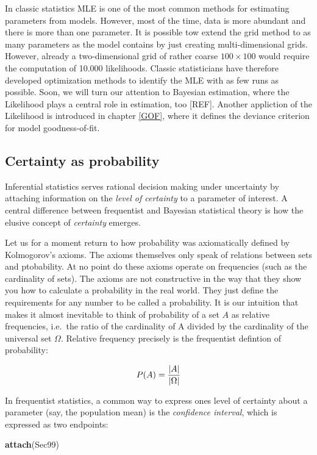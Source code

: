 \documentclass[]{svmono}
\newenvironment{Shaded}{\begin{snugshade}}{\end{snugshade}}
\newcommand{\KeywordTok}[1]{\textcolor[rgb]{0.13,0.29,0.53}{\textbf{#1}}}
\newcommand{\NormalTok}[1]{#1}
\begin{document}
In classic statistics MLE is one of the most common methods for
estimating parameters from models. However, most of the time, data is
more abundant and there is more than one parameter. It is possible tow
extend the grid method to as many parameters as the model contains by
just creating multi-dimensional grids. However, already a
two-dimensional grid of rather coarse \(100 \times 100\) would require
the computation of 10.000 likelihoods. Classic statisticians have
therefore developed optimization methods to identify the MLE with as few
runs as possible. Soon, we will turn our attention to Bayesian
estimation, where the Likelihood plays a central role in estimation, too
{[}REF{]}. Another appliction of the Likelihood is introduced in chapter
\ref{GOF}, where it defines the deviance criterion for model
goodness-of-fit.

\subsection{Certainty as probability}\label{certainty-as-probability}

Inferential statistics serves rational decision making under uncertainty
by attaching information on the \emph{level of certainty} to a parameter
of interest. A central difference between frequentist and Bayesian
statistical theory is how the elusive concept of \emph{certainty}
emerges.

Let us for a moment return to how probability was axiomatically defined
by Kolmogorov's axioms. The axioms themselves only speak of relations
between sets and ptobability. At no point do these axioms operate on
frequencies (such as the cardinality of sets). The axioms are not
constructive in the way that they show you how to calculate a
probability in the real world. They just define the requirements for any
number to be called a probability. It is our intuition that makes it
almost inevitable to think of probability of a set \(A\) as relative
frequencies, i.e.~the ratio of the cardinality of A divided by the
cardinality of the universal set \(\Omega\). Relative frequency
precisely is the frequentist defintion of probability:

\[
P(A) = {|A| \over |\Omega|}
\]

In frequentist statistics, a common way to express ones level of
certainty about a parameter (say, the population mean) is the
\emph{confidence interval}, which is expressed as two endpoints:

\begin{Shaded}
\begin{Highlighting}[]
\KeywordTok{attach}\NormalTok{(Sec99)}
\end{Highlighting}
\end{Shaded}
\end{document}
